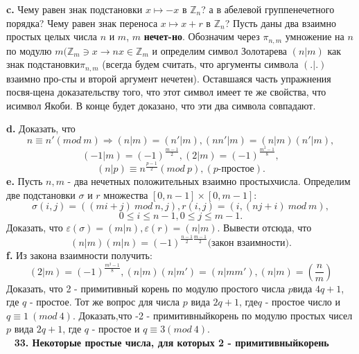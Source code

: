 \documentclass{mai_book}
\begin{document}
\hspace*{15pt}\textbf{c.} Чему равен знак подстановки $x\mapsto -x$ в $\mathbb{Z}_n$? а в абелевой группе\newline нечетного порядка? Чему равен знак переноса $x\mapsto x+r$ в $\mathbb{Z}_n$?\newline 
\hspace*{15pt} Пусть даны два взаимно простых целых числа $n$ и $m$, $m$ \textbf{нечет-\newline но}. Обозначим через ${\pi}_{n,m}$ умножение на $n$ по модулю $m(\mathbb{Z}_m \ni x \rightarrow$\newline $nx \in \mathbb{Z}_m$ и определим символ Золотарева $(n\vert m)$ как знак подстановки\newline ${\pi}_{n,m}$ (всегда будем считать, что аргументы символа $(.\vert .)$ взаимно про-\newline сты и второй аргумент нечетен). Оставшаяся часть упражнения посвя-\newline щена доказательству того, что этот символ имеет те же свойства, что и\newline символ Якоби. В конце будет доказано, что эти два символа совпадают.\newline
	
\newpage

\textbf{d.} Доказать, что
	$$
	n\equiv n' (mod\ m) \Rightarrow (n\vert m)=(n'\vert m), (nn'\vert m)=(n\vert m)(n'\vert m),
	$$
	$$
	(-1\vert m)={(-1)}^{\frac{m-1}{2}}, (2\vert m)={(-1)}^{\frac{m^2-1}{8}},
	$$
	$$
	(n\vert p)\equiv n^{\frac{p-1}{2}} (mod\ p), (p\text{-простое}).
	$$
\hspace*{15pt}\textbf{e.} Пусть $n, m$ - два нечетных положительных взаимно простых\newline числа. Определим две подстановки $\sigma$ и $r$ множества $[0, n-1] \times [0, m-1]:$
	$$
	\sigma(i,j)=((mi+j)\ mod\ n,j), r(i,j)=(i,(nj+i)\ mod\ m),
	$$
	$$
	0\leqslant i \leqslant n-1, 0\leqslant j \leqslant m-1.
	$$
	Доказать, что $\varepsilon (\sigma)=(m\vert n), \varepsilon (r)=(n\vert m)$. Вывести отсюда, что
	$$
	(n\vert m)(m\vert n)={(-1)}^{\frac{n-1}{2}\frac{m-1}{2}} \text{(закон взаимности).}
	$$
\hspace*{15pt}\textbf{f.} Из закона взаимности получить:
	$$
	(2\vert m)={(-1)}^{\frac{m^2-1}{8}}, (n\vert m)(n\vert m')=(n\vert mm'), (n\vert m)=(\frac{n}{m}) 
	$$
	Доказать, что 2 - примитивный корень по модулю простого числа $p$\newline вида $4q+1$, где $q$ - простое. Тот же вопрос для числа $p$ вида $2q+1$, где\newline $q$ - простое число и $q\equiv 1\ (mod\ 4)$. Доказать,что -2 - примитивный\newline корень по модулю простых чисел $p$ вида $2q+1$, где $q$ - простое и $q\equiv 3$\newline $(mod\ 4)$.\\
	\ \newline
\noindent\textbf{33. Некоторые простые числа, для которых 2 - примитивный\newline корень}\\
\end{document}
